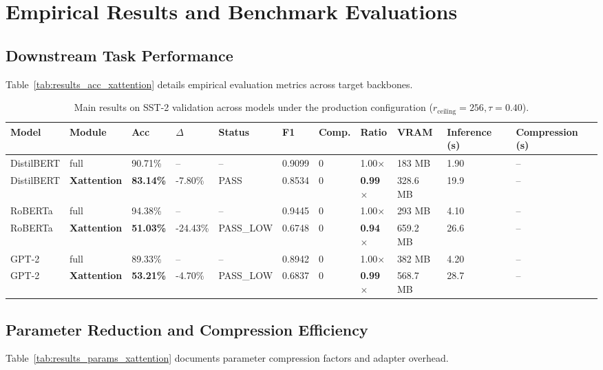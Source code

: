 \section{Empirical Results and Benchmark Evaluations}

\subsection{Downstream Task Performance}
Table~\ref{tab:results_acc_xattention} details empirical evaluation metrics across target backbones.

\begin{table}[t]
\centering
\small
\begin{tabular}{lllllllllll}
\toprule
\textbf{Model} & \textbf{Module} & \textbf{Acc} & \textbf{$\Delta$} & \textbf{Status} & \textbf{F1} & \textbf{Comp.} & \textbf{Ratio} & \textbf{VRAM} & \textbf{Inference (s)} & \textbf{Compression (s)} \\
\midrule
DistilBERT & full & 90.71\% & -- & -- & 0.9099 & 0 & 1.00$\times$ & 183 MB & 1.90 & -- \\
DistilBERT & \textbf{Xattention} & \textbf{83.14\%} & -7.80\% & PASS & 0.8534 & 0 & \textbf{0.99$\times$} & 328.6 MB & 19.9 & -- \\
RoBERTa & full & 94.38\% & -- & -- & 0.9445 & 0 & 1.00$\times$ & 293 MB & 4.10 & -- \\
RoBERTa & \textbf{Xattention} & \textbf{51.03\%} & -24.43\% & PASS_LOW & 0.6748 & 0 & \textbf{0.94$\times$} & 659.2 MB & 26.6 & -- \\
GPT-2 & full & 89.33\% & -- & -- & 0.8942 & 0 & 1.00$\times$ & 382 MB & 4.20 & -- \\
GPT-2 & \textbf{Xattention} & \textbf{53.21\%} & -4.70\% & PASS_LOW & 0.6837 & 0 & \textbf{0.99$\times$} & 568.7 MB & 28.7 & -- \\
\bottomrule
\end{tabular}
\caption{Main results on SST-2 validation across models under the production configuration ($r_{\mathrm{ceiling}}=256, \tau=0.40$).}
\label{tab:main_sst2}
\end{table}

\subsection{Parameter Reduction and Compression Efficiency}
Table~\ref{tab:results_params_xattention} documents parameter compression factors and adapter overhead.

